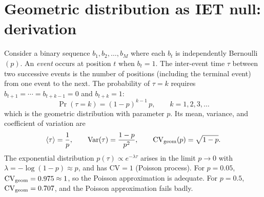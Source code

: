 \documentclass[12pt,a4paper]{article}
\newcommand{\meantau}{\langle\tau\rangle}
\newcommand{\CV}{\mathrm{CV}}
\newcommand{\TODO}[1]{\textcolor{red}{\textbf{[TODO: #1]}}}
\newcommand{\NOTE}[1]{\textcolor{blue}{\textbf{[NOTE: #1]}}}
\begin{document}
%
%


\appendix

\section{Geometric distribution as IET null: derivation}
\label{app:geometric}

Consider a binary sequence $b_1, b_2, \ldots, b_M$ where each $b_t$
is independently Bernoulli$(p)$.
An \emph{event} occurs at position $t$ when $b_t = 1$.
The inter-event time $\tau$ between two successive events is the number
of positions (including the terminal event) from one event to the next.
The probability of $\tau = k$ requires $b_{t+1} = \cdots = b_{t+k-1}
= 0$ and $b_{t+k} = 1$:
\begin{equation}
  \Pr(\tau = k) = (1-p)^{k-1}\,p, \qquad k = 1, 2, 3, \ldots
\end{equation}
which is the geometric distribution with parameter $p$.
Its mean, variance, and coefficient of variation are
\begin{equation}
  \meantau = \frac{1}{p},
  \qquad
  \mathrm{Var}(\tau) = \frac{1-p}{p^2},
  \qquad
  \CV_{\rm geom}(p) = \sqrt{1-p}.
\end{equation}
The exponential distribution $p(\tau) \propto e^{-\lambda\tau}$ arises
in the limit $p \to 0$ with $\lambda = -\log(1-p) \approx p$, and has
$\CV = 1$ (Poisson process).
For $p = 0.05$, $\CV_{\rm geom} = 0.975 \approx 1$, so the Poisson
approximation is adequate.
For $p = 0.5$, $\CV_{\rm geom} = 0.707$, and the Poisson
approximation fails badly.
\end{document}

